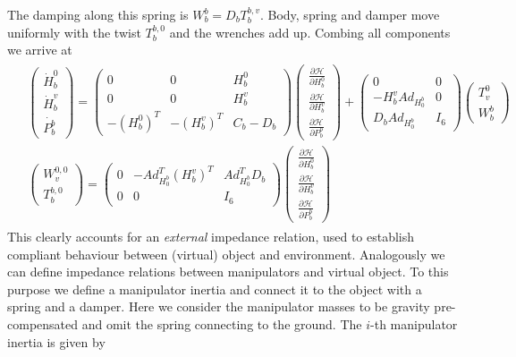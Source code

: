 \documentclass[a4paper,twoside, openright,12pt]{report}
\begin{document}
The damping along this spring is $W_b^b = D_b T_b^{b,v} $. Body, spring and damper move uniformly with the twist $T_b^{b,0}$ and the wrenches add up. Combing all components we arrive at
\begin{eqnarray} \label{EQ:externalimpedance}
\begin{aligned}
&\begin{pmatrix}\dot{H}_b^0 \\ \dot{H}_b^v \\  \dot{P_b^b}\end{pmatrix} =
\begin{pmatrix} 0 & 0 & H_b^0  \\ 0 & 0 & H_b^v \\
- (H_b^0)^T & -(H_b^v)^T & C_b-D_b\end{pmatrix}
\begin{pmatrix}\frac{\partial \mathcal{H}}{\partial H_b^0}\\ \frac{\partial \mathcal{H}}{\partial H_b^v} \\ \frac{\partial \mathcal{H}}{\partial P_b^b}\end{pmatrix}+
\begin{pmatrix} 0 & 0\\ -H_b^v Ad_{H_0^b} & 0 \\ D_b Ad_{H_0^b} & I_6 \end{pmatrix}\begin{pmatrix} T_v^0 \\ W_{b}^b\end{pmatrix} \\
&\begin{pmatrix}W_v^{0,0} \\ T_b^{b,0}\end{pmatrix} = \begin{pmatrix}0 & -Ad_{H_0^b}^T (H_b^v)^T & Ad_{H_0^b}^T D_b\\ 0 & 0 & I_6 \end{pmatrix}
\begin{pmatrix}\frac{\partial \mathcal{H}}{\partial H_b^0}\\ \frac{\partial \mathcal{H}}{\partial H_b^v} \\ \frac{\partial \mathcal{H}}{\partial P_b^b}\end{pmatrix}
\end{aligned}
\end{eqnarray}
This clearly accounts for an \emph{external} impedance relation, used to establish compliant behaviour between (virtual) object and environment. Analogously we can define impedance relations between manipulators and virtual object. To this purpose we define a manipulator inertia and connect it to the object with a spring and a damper. Here we consider the manipulator masses to be gravity pre-compensated and omit the spring connecting to the ground. The $i$-th manipulator inertia is given by
\end{document}

